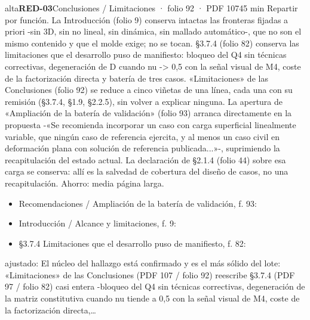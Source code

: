 \begin{ficha}{alta}{\casilla\textbf{RED-03}\quad{}\quad Conclusiones /\allowbreak{} Limitaciones · folio 92 · PDF 107\hfill 45 min}
Repartir por función. La Introducción (folio 9) conserva intactas las fronteras fijadas a priori -sin 3D, sin no lineal, sin dinámica, sin mallado automático-, que no son el mismo contenido y que el molde exige; no se tocan. §3.7.4 (folio 82) conserva las limitaciones que el desarrollo puso de manifiesto: bloqueo del Q4 sin técnicas correctivas, degeneración de D cuando nu -\textgreater{} 0,5 con la señal visual de M4, coste de la factorización directa y batería de tres casos. «Limitaciones» de las Conclusiones (folio 92) se reduce a cinco viñetas de una línea, cada una con su remisión (§3.7.4, §1.9, §2.2.5), sin volver a explicar ninguna. La apertura de «Ampliación de la batería de validación» (folio 93) arranca directamente en la propuesta -«Se recomienda incorporar un caso con carga superficial linealmente variable, que ningún caso de referencia ejercita, y al menos un caso civil en deformación plana con solución de referencia publicada...»-, suprimiendo la recapitulación del estado actual. La declaración de §2.1.4 (folio 44) sobre esa carga se conserva: allí es la salvedad de cobertura del diseño de casos, no una recapitulación. Ahorro: media página larga.\par
{}\begin{itemize}[leftmargin=1.2em,itemsep=1pt,topsep=1pt]
\item {\small Recomendaciones /\allowbreak{} Ampliación de la batería de validación, f. 93: }
\item {\small Introducción /\allowbreak{} Alcance y limitaciones, f. 9: }
\item {\small §3.7.4 Limitaciones que el desarrollo puso de manifiesto, f. 82: }
\end{itemize}
{\footnotesize\color{gris}ajustado: El núcleo del hallazgo está confirmado y es el más sólido del lote: «Limitaciones» de las Conclusiones (PDF 107 /\allowbreak{} folio 92) reescribe §3.7.4 (PDF 97 /\allowbreak{} folio 82) casi entera -bloqueo del Q4 sin técnicas correctivas, degeneración de la matriz constitutiva cuando nu tiende a 0,5 con la señal visual de M4, coste de la factorización directa,…\par}
\end{ficha}
{\small{}\par}
